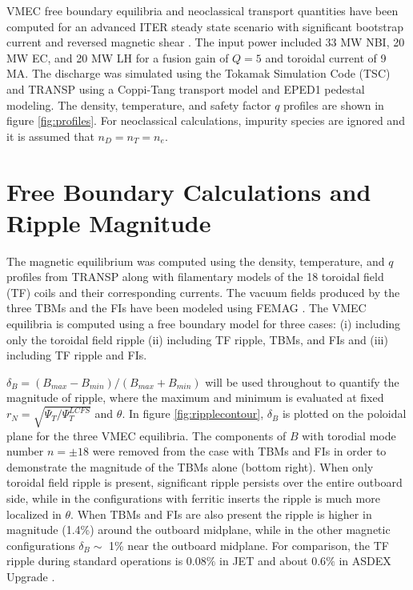 \documentclass{article}
\begin{document}
VMEC free boundary equilibria and neoclassical transport quantities have been computed for an advanced ITER steady state scenario with significant bootstrap current and reversed magnetic shear \cite{Poli2014}. The input power included 33 MW NBI, 20 MW EC, and 20 MW LH for a fusion gain of $Q = 5$ and toroidal current of 9 MA. The discharge was simulated using the Tokamak Simulation Code (TSC) \cite{Jardin1986} and TRANSP \cite{Hawryluk1980} using a Coppi-Tang transport model and EPED1 \cite{Snyder2011} pedestal modeling. The density, temperature, and safety factor $q$ profiles are shown in figure \ref{fig:profiles}. For neoclassical calculations, impurity species are ignored and it is assumed that $n_D = n_T = n_e$. 

\FloatBarrier

\section{Free Boundary Calculations and Ripple Magnitude}

The magnetic equilibrium was computed using the density, temperature, and $q$ profiles from TRANSP along with filamentary models of the 18 toroidal field (TF) coils and their corresponding currents. The vacuum fields produced by the three TBMs and the FIs have been modeled using FEMAG \cite{Shinohara2009}. The VMEC equilibria is computed using a free boundary model \cite{Hirshman1986} for three cases: (i) including only the toroidal field ripple (ii) including TF ripple, TBMs, and FIs and (iii) including TF ripple and FIs.  

$\delta_B = (B_{max}-B_{min})/(B_{max} + B_{min})$ will be used throughout to quantify the magnitude of ripple, where the maximum and minimum is evaluated at fixed $r_N = \sqrt{\Psi_T/\Psi_T^{LCFS}}$ and $\theta$. In figure \ref{fig:ripplecontour}, $\delta_B$ is plotted on the poloidal plane for the three VMEC equilibria. The components of $B$ with torodial mode number $n = \pm 18$ were removed from the case with TBMs and FIs in order to demonstrate the magnitude of the TBMs alone (bottom right). When only toroidal field ripple is present, significant ripple persists over the entire outboard side, while in the configurations with ferritic inserts the ripple is much more localized in $\theta$. When TBMs and FIs are also present the ripple is higher in magnitude (1.4\%) around the outboard midplane, while in the other magnetic configurations $\delta_B \sim$ 1\% near the outboard midplane. For comparison, the TF ripple during standard operations is $0.08\%$ in JET \cite{DeVries2008} and about $0.6\%$ in ASDEX Upgrade \cite{Martitsch2016}. 
\end{document}
